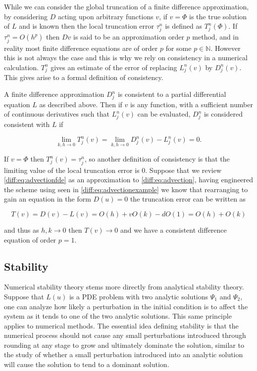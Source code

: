 \documentclass[../main.tex]{subfiles}
\begin{document}
  While we can consider the global truncation of a finite difference approximation, by considering $D$ acting upon arbitrary functions $v$, if $v = \Phi$ is the true solution of $L$ and is known then the local truncation error $\tau^n_j$ is defined as $T^n_j(\Phi)$. If $\tau^n_j = O(h^p)$ then $Dv$ is said to be an approximation order $p$ method, and in reality most finite difference equations are of order $p$ for some $p \in \mathbb{N}$. However this is not always the case and this is why we rely on consistency in a numerical calculation. $T^n_j$ gives an estimate of the error of replacing $L^n_j(v)$ by $D^n_j(v)$. This gives arise to a formal definition of consistency.

  \begin{definition}[Consistency]
    A finite difference approximation $D^n_j$ is consistent to a partial differential equation $L$ as described above. Then if $v$ is any function, with a sufficient number of continuous derivatives such that $L^n_j(v)$ can be evaluated, $D^n_j$ is considered consistent with $L$ if

    \begin{equation}
      \lim_{k, h \to 0} T^n_j(v) = \lim_{k, h \to 0} D^n_j(v) - L^n_j(v) = 0.
    \end{equation}
  \end{definition}

  If $v = \Phi$ then $T^n_j(v) = \tau^n_j$, so another definition of consistency is that the limiting value of the local truncation error is $0$. Suppose that we review \autoref{diff:eq:advectionfde} as an approximation to \autoref{diff:eq:advection}, having engineered the scheme using \cite{fornberg1988} seen in \autoref{diff:eq:advectionexample} we know that rearranging to gain an equation in the form $D(u) = 0$ the truncation error can be written as

  \begin{equation}
    T(v) = D(v) - L(v) = O(h) + v O(k) - d O(1) = O(h) + O(k)
  \end{equation}

  and thus as $h, k \to 0$ then $T(v) \to 0$ and we have a consistent difference equation of order $p = 1$.

  \subsection{Stability}
  Numerical stability theory stems more directly from analytical stability theory. Suppose that $L(u)$ is a PDE problem with two analytic solutions $\Psi_1$ and $\Psi_2$, one can analyze how likely a perturbation in the initial condition is to affect the system as it tends to one of the two analytic solutions. This same principle applies to numerical methods. The essential idea defining stability is that the numerical process should not cause any small perturbations introduced through rounding at any stage to grow and ultimately dominate the solution, similar to the study of whether a small perturbation introduced into an analytic solution will cause the solution to tend to a dominant solution.
\end{document}

